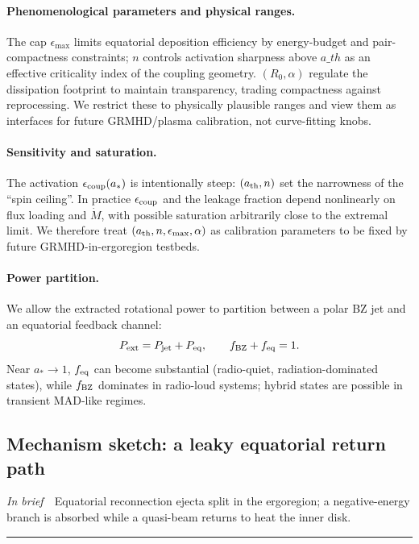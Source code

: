 \documentclass[twocolumn]{aastex701}
\newcommand{\ath}{a_{\rm th}}
\newcommand{\rg}{r_g}
\newcommand{\LEdd}{L_{\rm Edd}}
\newcommand{\Ltot}{L_{\rm tot}}
\newcommand{\FeKa}{\mathrm{Fe\,K}\alpha}
\providecommand{\tldr}[1]{%
  \noindent\textit{In brief}\ \textemdash\ #1%
  \par\smallskip
  \noindent\rule{\columnwidth}{0.2pt}\par\medskip
}
\def\ath{a\_th}\def\rg{r\_g}\def\LEdd{L\_Edd}\def\Ltot{L\_tot}\def\FeKa{Fe K\string\alpha}%
\begin{document}
\paragraph{Phenomenological parameters and physical ranges.}
The cap $\epsilon_{\max}$ limits equatorial deposition efficiency by energy-budget and pair-compactness constraints; $n$ controls activation sharpness above $\ath$ as an effective criticality index of the coupling geometry. $(R_0,\alpha)$ regulate the dissipation footprint to maintain transparency, trading compactness against reprocessing. We restrict these to physically plausible ranges and view them as interfaces for future GRMHD/plasma calibration, not curve-fitting knobs.
\paragraph{Sensitivity and saturation.}
The activation $\epsilon_{\rm coup}(a_*)$ is intentionally steep: $(a_{\rm th},n)$ set the narrowness of the “spin ceiling”. In practice $\epsilon_{\rm coup}$ and the leakage fraction depend nonlinearly on flux loading and $\dot M$, with possible saturation arbitrarily close to the extremal limit. We therefore treat $(a_{\rm th},n,\epsilon_{\max},\alpha)$ as calibration parameters to be fixed by future GRMHD-in-ergoregion testbeds.


\paragraph{Power partition.}
We allow the extracted rotational power to partition between a polar BZ jet and an equatorial feedback channel:
\[
P_{\rm ext}=P_{\rm jet}+P_{\rm eq},\qquad f_{\rm BZ}+f_{\rm eq}=1.
\]
Near $a_*\!\to\!1$, $f_{\rm eq}$ can become substantial (radio-quiet, radiation-dominated states), while $f_{\rm BZ}$ dominates in radio-loud systems; hybrid states are possible in transient MAD-like regimes.
\subsection{Mechanism sketch: a leaky equatorial return path}\label{sec:mech-sketch}
\tldr{Equatorial reconnection ejecta split in the ergoregion; a negative-energy branch is absorbed while a quasi-beam returns to heat the inner disk.}
\end{document}

